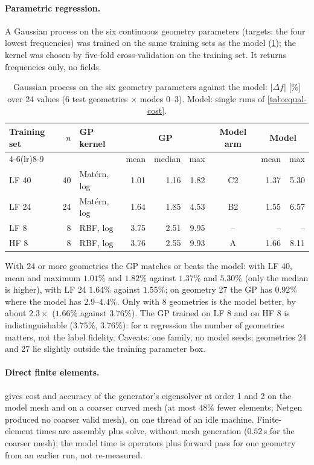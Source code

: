 \paragraph{Parametric regression.} A Gaussian process on the six continuous geometry parameters (targets: the four lowest frequencies) was trained on the same training sets as the model (\cref{tab:07-gp}); the kernel was chosen by five-fold cross-validation on the training set. It returns frequencies only, no fields.

\begin{table}[!htb]
\centering\footnotesize
\caption{Gaussian process on the six geometry parameters against the model: $|\Delta f|$ [\%] over 24 values (6 test geometries $\times$ modes 0--3). Model: single runs of \cref{tab:equal-cost}.}
\label{tab:07-gp}
\setlength{\tabcolsep}{5pt}
\begin{tabular}{lrlrrrcrr}
\toprule
Training set & $n$ & GP kernel & \multicolumn{3}{c}{GP} & Model arm & \multicolumn{2}{c}{Model}\\
\cmidrule(lr){4-6}\cmidrule(lr){8-9}
 & & & mean & median & max & & mean & max\\
\midrule
LF 40 & 40 & Mat\'ern, log & 1.01 & 1.16 & 1.82 & C2 & 1.37 & 5.30\\
LF 24 & 24 & Mat\'ern, log & 1.64 & 1.85 & 4.53 & B2 & 1.55 & 6.57\\
LF 8  & 8  & RBF, log & 3.75 & 2.51 & 9.95 & -- & -- & --\\
HF 8  & 8  & RBF, log & 3.76 & 2.55 & 9.93 & A & 1.66 & 8.11\\
\bottomrule
\end{tabular}
\end{table}

With 24 or more geometries the GP matches or beats the model: with LF 40, mean and maximum $1.01\%$ and $1.82\%$ against $1.37\%$ and $5.30\%$ (only the median is higher), with LF 24 $1.64\%$ against $1.55\%$; on geometry 27 the GP has $0.92\%$ where the model has $2.9$--$4.4\%$. Only with 8 geometries is the model better, by about $2.3\times$ ($1.66\%$ against $3.76\%$). The GP trained on LF 8 and on HF 8 is indistinguishable ($3.75\%$, $3.76\%$): for a regression the number of geometries matters, not the label fidelity. Caveats: one family, no model seeds; geometries 24 and 27 lie slightly outside the training parameter box.

\paragraph{Direct finite elements.}  gives cost and accuracy of the generator's eigensolver at order 1 and 2 on the model mesh and on a coarser curved mesh (at most $48\%$ fewer elements; Netgen produced no coarser valid mesh), on one thread of an idle machine. Finite-element times are assembly plus solve, without mesh generation ($0.52$\,s for the coarser mesh); the model time is operators plus forward pass for one geometry from an earlier run, not re-measured.

